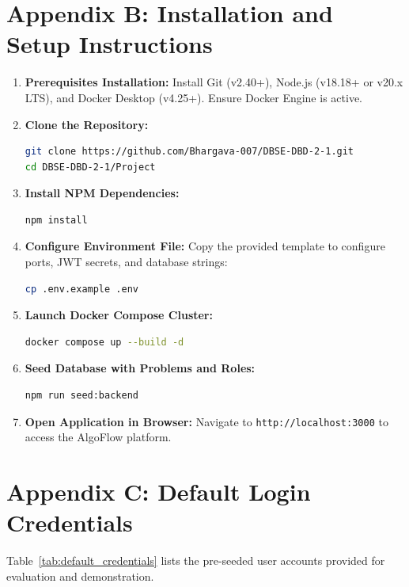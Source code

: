 \documentclass[12pt,a4paper]{report}
\begin{document}
\clearpage

\section*{Appendix B: Installation and Setup Instructions}
\begin{enumerate}[leftmargin=*, label=\bfseries\arabic*.]
  \item \textbf{Prerequisites Installation:}
  Install Git (v2.40+), Node.js (v18.18+ or v20.x LTS), and Docker Desktop (v4.25+). Ensure Docker Engine is active.

  \item \textbf{Clone the Repository:}
  \begin{lstlisting}[language=bash]
git clone https://github.com/Bhargava-007/DBSE-DBD-2-1.git
cd DBSE-DBD-2-1/Project
  \end{lstlisting}

  \item \textbf{Install NPM Dependencies:}
  \begin{lstlisting}[language=bash]
npm install
  \end{lstlisting}

  \item \textbf{Configure Environment File:}
  Copy the provided template to configure ports, JWT secrets, and database strings:
  \begin{lstlisting}[language=bash]
cp .env.example .env
  \end{lstlisting}

  \item \textbf{Launch Docker Compose Cluster:}
  \begin{lstlisting}[language=bash]
docker compose up --build -d
  \end{lstlisting}

  \item \textbf{Seed Database with Problems and Roles:}
  \begin{lstlisting}[language=bash]
npm run seed:backend
  \end{lstlisting}

  \item \textbf{Open Application in Browser:}
  Navigate to \texttt{http://localhost:3000} to access the AlgoFlow platform.
\end{enumerate}

\vspace{0.8cm}

\section*{Appendix C: Default Login Credentials}
Table~\ref{tab:default_credentials} lists the pre-seeded user accounts provided for evaluation and demonstration.
\end{document}
